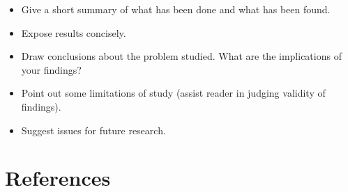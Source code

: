 \documentclass[a4paper,11pt]{article}
\begin{document}
\begin{itemize}
\item
  Give a short summary of what has been done and what has been found.
\item
  Expose results concisely.
\item
  Draw conclusions about the problem studied. What are the implications of your
  findings?
\item
  Point out some limitations of study (assist reader in judging validity of
  findings).
\item
  Suggest issues for future research.
\end{itemize}
\newpage

\hypertarget{references}{%
\section*{References}\label{references}}

\noindent

\setlength{\parindent}{-0.5cm}
\setlength{\leftskip}{0.5cm}
\setlength{\parskip}{8pt}
\end{document}
